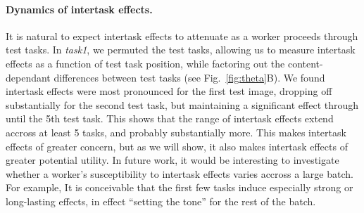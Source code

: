 \documentclass[12pt]{article}
\begin{document}
\paragraph{Dynamics of intertask effects.} It is natural to expect 
intertask effects to attenuate as a worker proceeds through test tasks.  
In \textit{task1}, we permuted the test tasks, allowing us to 
measure intertask effects as a function of test task position, while factoring
out the content-dependant differences between test tasks
(see Fig.~\ref{fig:theta}B). 
We found intertask effects were most pronounced for the first test image,
dropping off substantially for the second test task, but maintaining a 
significant effect through until the 5th test task.  
This shows that the range of intertask effects extend accross at least 5 
tasks, and probably substantially more.
This makes intertask effects of greater concern, but as we will show, it also
makes intertask effects of greater potential utility.
In future work, it would be interesting to investigate whether a worker's
susceptibility to intertask effects varies accross a large batch.  For example,
It is conceivable that the first few tasks induce especially strong
or long-lasting effects, in effect ``setting the tone'' for the rest of the batch.
\end{document}
